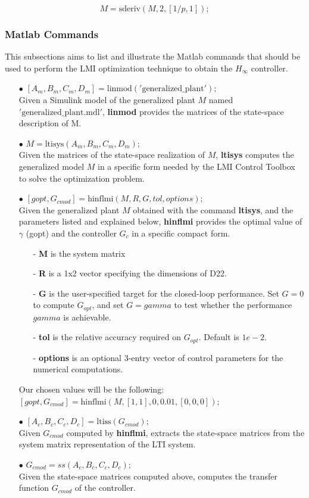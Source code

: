 \documentclass[a4paper,10pt,titlepage]{article}
\numberwithin{equation}{subsection}
\begin{document}
	\begin{equation}
		M = \text{sderiv}(M,2,\left[ 1/p,1 \right]);
	\end{equation}
	
	\subsubsection{Matlab Commands}
	This subsections aims to list and illustrate the Matlab commands that should be used to perform the LMI optimization technique to obtain the $H_\infty$ controller.
	\begin{enumerate}
		\item[$\bullet$] $[A_m,B_m,C_m,D_m] = \text{linmod}('\text{generalized\_plant}');$ \\
		Given a Simulink model of the generalized plant $M$ named $'\text{generalized\_plant.mdl}'$, \textbf{linmod} provides the matrices of the state-space description of M.
		\item[$\bullet$] $M = \text{ltisys}(A_m,B_m,C_m,D_m);$\\
		Given the matrices of the state-space realization of $M$, \textbf{ltisys} computes the generalized model $M$ in a specific form needed by the LMI Control Toolbox to solve the optimization problem.
		\item[$\bullet$] $[gopt,G_{cmod}] = \text{hinflmi}(M,R,G,tol,options);$\\
		Given the generalized plant $M$ obtained with the command \textbf{ltisys}, and the parameters listed and explained below, \textbf{hinflmi} provides the optimal value of $\gamma$ (gopt) and the controller $G_c$ in a specific compact form.
		\begin{enumerate}
			\item[-] \textbf{M} is the system matrix
			\item[-] \textbf{R} is a 1x2 vector specifying the dimensions of D22.
			\item[-] \textbf{G} is the user-specified target for the closed-loop performance. Set $G=0$ to compute $G_{opt}$, and set  $G=gamma$  to test whether the performance $gamma$ is achievable.
			\item[-] \textbf{tol} is the relative accuracy required on $G_{opt}$. Default is $1e-2$.
			\item[-] \textbf{options} is an optional 3-entry vector of control parameters for the numerical computations.
		\end{enumerate}		
		Our chosen values will be the following:\\
		$[gopt,G_{cmod}] = \text{hinflmi}(M,\left[ 1,1 \right],0,0.01, \left[ 0,0,0 \right]);$
		\item[$\bullet$] $[A_c,B_c,C_c,D_c] = \text{ltiss}(G_{cmod});$\\
		Given $G_{cmod}$ computed by \textbf{hinflmi}, extracts the state-space matrices from the system
		matrix representation of the LTI system.
		\item[$\bullet$] $G_{cmod} = ss(A_c,B_c,C_c,D_c);$\\
		Given the state-space matrices computed above, computes the transfer function $G_{cmod}$ of the controller.
	\end{enumerate} 
	
\end{document}
